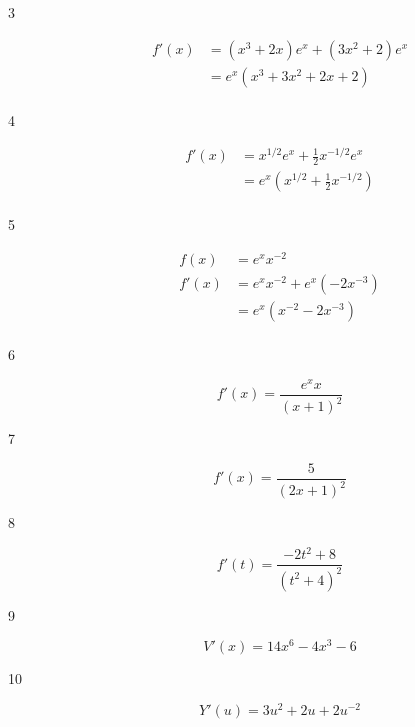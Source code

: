 \documentclass[letterpaper, landscape]{exam}
\begin{document}
  \begin{description}

    \item[3] 
      \begin{align*}
        f'(x) & = \left( x^3 + 2x \right) e^x + \left( 3x^2 + 2 \right) e^x \\
              & = \boxed{ e^x \left( x^3 + 3x^2 + 2x + 2 \right) } \\
      \end{align*}

    \item[4] 
      \begin{align*}
        f'(x) & = x^{1/2} e^x + \frac{1}{2} x^{-1/2} e^x \\
        & = \boxed{ e^x \left( x^{1/2} + \frac{1}{2} x^{-1/2} \right) } \\
      \end{align*}

    \item[5] 
      \begin{align*}
        f(x)  & = e^x x^{-2} \\
        f'(x) & = e^x x^{-2} + e^x \left( -2 x^{-3} \right) \\
              & = \boxed{ e^x \left( x^{-2} -2 x^{-3} \right) } \\
      \end{align*}

    \item[6] 
      \[
        f'(x) = \boxed{ \frac{e^x x}{(x + 1)^2} }      
      \]

    \item[7] 
      \[
        f'(x) = \boxed{ \frac{5}{(2x + 1)^2} }
      \]

    \item[8] 
      \[
        f'(t) = \boxed{ \frac{ - 2t^2 + 8  }{\left( t^2 + 4 \right)^2} }
      \]
      
    \item[9] 
      \[
        V'(x) = \boxed{ 14x^6 - 4x^3 - 6 } 
      \]
      
    \item[10] 
      \[
        Y'(u) = \boxed{ 3u^2 + 2u + 2u^{-2} } 
      \]
      
      


\end{description}
\end{document}
